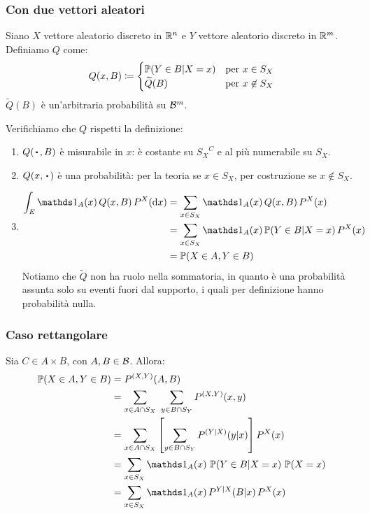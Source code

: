 \subsubsection{Con due vettori aleatori}
Siano $X$ vettore aleatorio discreto in $\mathbb R^n$ e $Y$ vettore aleatorio discreto in $\mathbb R^m$. Definiamo $Q$ come:
$$Q(x, B) \coloneqq \begin{cases}
  \mathbb P(Y \in B | X = x) & \text{per } x \in S_X \\
  \widetilde{Q}(B) & \text{per } x \not\in S_X
\end{cases}$$
$\widetilde Q(B)$ è un'arbitraria probabilità su $\mathcal B^m$.

Verifichiamo che $Q$ rispetti la definizione:
\begin{enumerate}
  \item $Q(\, \bigcdot \, , B)$ è misurabile in $x$: è costante su ${S_X}^C$ e al più numerabile su $S_X$.
  \item $Q(x, \, \bigcdot \,)$ è una probabilità: per la teoria se $x \in S_X$, per costruzione se $x \not\in S_X$.
  \item \Fixvmode \begin{align*}
    \int_E \Ind_A(x) \, Q(x, B) \, P^X(\dx) &= \sum_{x \in S_X} \Ind_A(x) \, Q(x, B) \, P^X(x) \\
    &= \sum_{x \in S_X} \Ind_A(x) \, \PP(Y \in B | X=x) \, P^X(x) \\
    &= \PP(X \in A, Y \in B)
  \end{align*}
  Notiamo che $\widetilde Q$ non ha ruolo nella sommatoria, in quanto è una probabilità assunta solo su eventi fuori dal supporto, i quali per definizione hanno probabilità nulla.
\end{enumerate}

\subsubsection{Caso rettangolare}
Sia $C \in A \times B$, con  $A, B \in \mathcal B$. Allora:
\begin{align*}
	\PP(X \in A, Y \in B) &= P^{(X, Y)}(A, B) \\
	&= \sum_{x \in A \cap S_X} \ \sum_{y \in B \cap S_Y} P^{(X, Y)}(x, y) \\
	&= \sum_{x \in A \cap S_X} \left[ \sum_{y \in B \cap S_Y} P^{(Y|X)}(y|x) \right] P^X(x) \\
	&= \sum_{x \in S_X} \Ind_A(x) \ \PP(Y \in B|X=x) \ \PP(X=x) \\
	&= \sum_{x \in S_X} \Ind_A(x) \, P^{Y|X}(B|x) \, P^X(x)
\end{align*}

